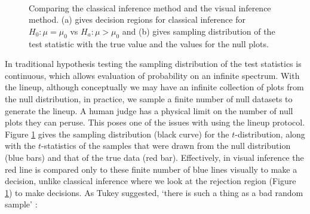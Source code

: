 \documentclass[12]{article}
\begin{document}
\begin{figure}[htbp]
\centering
\mbox{\quad
{}}
\caption{Comparing the classical inference method and the visual inference method.  (a) gives decision regions  for classical inference for $H_0: \mu=\mu_0$ vs $H_a:\mu>\mu_0$ and (b) gives sampling distribution of the test statistic with the true value and the values for the null plots.  } 
\label{compare}
\end{figure}


In traditional hypothesis testing the sampling distribution of the test statistics is continuous, which allows evaluation of probability on an infinite spectrum. With the lineup, although conceptually we may have an infinite collection of plots from the null distribution, in practice, we sample a finite number of null datasets to generate the lineup. A human judge has a physical limit on the number of null plots they can peruse. This poses one of the issues with using the lineup protocol.  Figure \ref{compare} gives the sampling distribution (black curve) for the $t$-distribution, along with the $t$-statistics of the samples that were drawn from the null distribution (blue bars) and that of the true data (red bar). %
Effectively,  in visual inference the red line is compared only to these finite number of blue lines visually to make a decision, unlike classical inference where we look at the rejection region (Figure \ref{compare}) to make decisions. As Tukey suggested, `there is such a thing as a bad random sample' \citep{fernholz03}:
\end{document}
